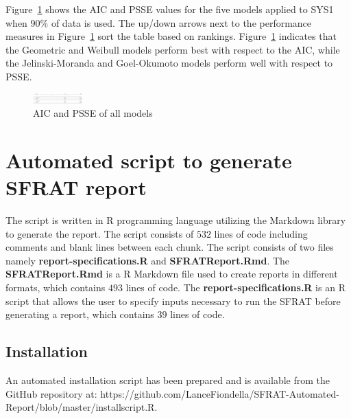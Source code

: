 \documentclass[journal]{IEEEtran}
\begin{document}
Figure~\ref{fig_SRT_tab4_table} shows the AIC and PSSE values for the five models applied to SYS1 when $90\%$ of data is used. The up/down arrows next to the performance measures in Figure~\ref{fig_SRT_tab4_table} sort the table based on rankings. Figure~\ref{fig_SRT_tab4_table} indicates that the Geometric and Weibull models perform best with respect to the AIC, while the Jelinski-Moranda and Goel-Okumoto models perform well with respect to PSSE.


\begin{figure}[!h]
\centering
\includegraphics[width=\textwidth]{Figures/SRT_tab4_table}%
\caption{AIC and PSSE of all models}
\label{fig_SRT_tab4_table}
\end{figure}




\section{Automated script to generate SFRAT report}\label{sec:Script}
The script is written in R programming language utilizing the Markdown library to generate the report. The script consists of $532$ lines of code including comments and blank lines between each chunk. The script consists of two files namely \textbf{report-specifications.R} and \textbf{SFRATReport.Rmd}. The \textbf{SFRATReport.Rmd} is a R Markdown file used to create reports in different formats, which contains $493$ lines of code. The \textbf{report-specifications.R} is an R script that allows the user to specify inputs necessary to run the SFRAT before generating a report, which contains $39$ lines of code.

\subsection{Installation}\label{sec:ScriptInstall}
An automated installation script has been prepared and is available from the GitHub repository at: https://github.com/LanceFiondella/SFRAT-Automated-Report/blob/master/installscript.R. 
\end{document}
